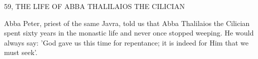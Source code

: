 59, THE LIFE OF ABBA THALILAIOS THE CILICIAN

Abba Peter, priest of the same Javra, told us that Abba Thalilaios
the Cilician spent sixty years in the monastic life and never once
stopped weeping. He would always say: 'God gave us this time for
repentance; it is indeed for Him that we must seek'.

